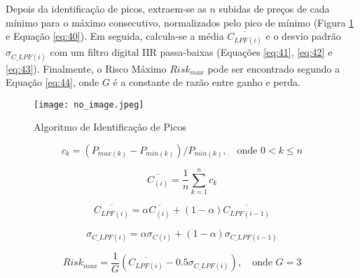 \begin{itemize}
    Depois da identificação de picos, extraem-se as \begin{math} n \end{math} subidas de preços de cada mínimo para o máximo consecutivo, normalizados pelo pico de mínimo (Figura \ref{fig:107} e Equação \ref{eq:40}). Em seguida, calcula-se a média \begin{math} \overline{C_{LPF(i)}} \end{math} e o desvio padrão \begin{math} \sigma_{C\_LPF(i)} \end{math} com um filtro digital IIR passa-baixas (Equações \ref{eq:41}, \ref{eq:42} e \ref{eq:43}). Finalmente, o Risco Máximo \begin{math} Risk_{max} \end{math} pode ser encontrado segundo a Equação \ref{eq:44}, onde \begin{math} G \end{math} é a constante de razão entre ganho e perda.

    \begin{figure}[h]
        \texttt{[image: no\_image.jpeg]}
        \centering
        \caption{Algoritmo de Identificação de Picos}
        \label{fig:107}
    \end{figure}

    \begin{equation} \label{eq:40}
        c_k = (P_{max(k)} - P_{min(k)}) / P_{min(k)}, \quad \textrm{onde } 0 < k \le n
    \end{equation}

    \begin{equation} \label{eq:41}
        \overline{C_{(i)}} = \dfrac{1}{n} \sum_{k=1}^{n} c_k
    \end{equation}

    \begin{equation} \label{eq:42}
        \overline{C_{LPF(i)}} = \alpha \overline{C_{(i)}} + (1 - \alpha) \overline{C_{LPF(i-1)}}
    \end{equation}

    \begin{equation} \label{eq:43}
        \sigma_{C\_LPF(i)} = \alpha \sigma_{C(i)} + (1 - \alpha) \sigma_{C\_LPF(i-1)}
    \end{equation}

    \begin{equation} \label{eq:44}
        Risk_{max} = \dfrac{1}{G} (\overline{C_{LPF(i)}} - 0.5\sigma_{C\_LPF(i)}), \quad \textrm{onde } G = 3
    \end{equation}


\end{itemize}
